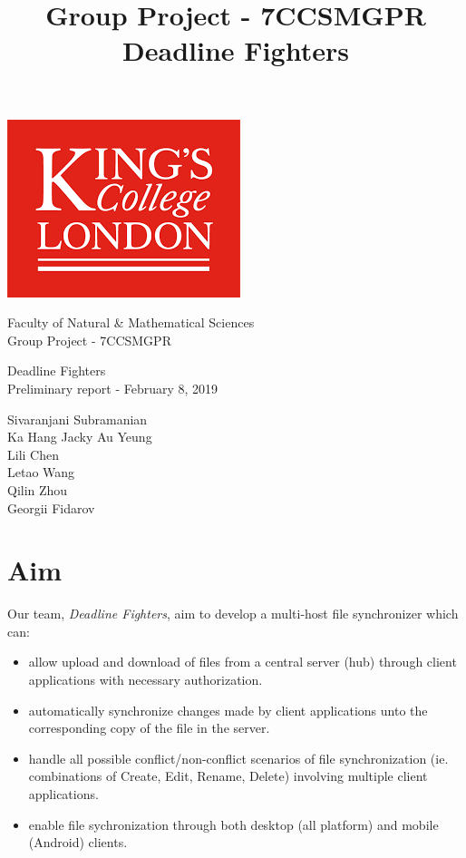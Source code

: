 \documentclass[a4paper]{article}
\title{Group Project - 7CCSMGPR \hspace{0.5 cm}Deadline Fighters}
\begin{document}
{
\begin{center}
    \includegraphics[scale=1]{images/Logo.png}
\end{center}
\begin{center}
        \Huge{Faculty of Natural \& Mathematical Sciences}\\
		\Huge{Group Project - 7CCSMGPR}
\end{center}
\begin{center}
		\Huge Deadline Fighters \\
		\Large Preliminary report - February 8, 2019 \\
\end{center}
\begin{center}
		\large Sivaranjani Subramanian \\
        \large Ka Hang Jacky Au Yeung \\
        \large Lili Chen \\
        \large Letao Wang \\
        \large Qilin Zhou \\
        \large Georgii Fidarov\\
\end{center}

\newpage
\section{Aim}
Our team, \emph{Deadline Fighters}, aim to develop a multi-host file synchronizer which can:
\begin{itemize}
\item{allow upload and download of files from a central server (hub) through client applications with necessary authorization.}
\item{automatically synchronize changes made by client applications unto the corresponding copy of the file in the server.}
\item{handle all possible conflict/non-conflict scenarios of file synchronization (ie. combinations of Create, Edit, Rename, Delete) involving multiple client applications.}
\item{enable file sychronization through both desktop (all platform) and mobile (Android) clients.}
\end{itemize}

}
\end{document}

